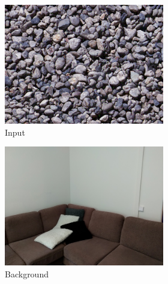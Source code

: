 \begin{figure}[]
\begin{subfigure}{\textwidth}
        \begin{subfigure}{0.24\textwidth}
            \centering
            \includegraphics[width=\textwidth]{images/04-experiment02/sofa/pebbles/target.jpg}
            \caption*{Input}
        \end{subfigure}
        \hfill
        \begin{subfigure}{0.24\textwidth}
            \centering
            \includegraphics[width=\textwidth]{images/04-experiment02/sofa/bg.jpg}
            \caption*{Background}
        \end{subfigure}
        \hfill
        \begin{subfigure}{0.24\textwidth}
            \centering

\end{subfigure}
\end{subfigure}
\end{figure}
